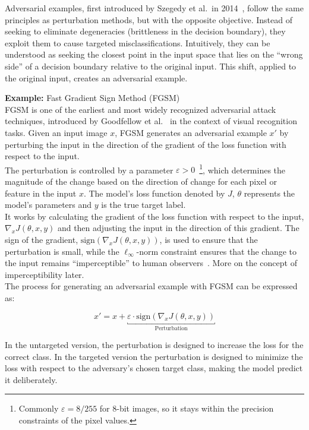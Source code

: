 \documentclass[a4paper, oneside]{discothesis}
\begin{document}
Adversarial examples, first introduced by Szegedy et al.\ in 2014~\cite{szegedy2013intriguing}, follow the same principles as perturbation methods, but with the opposite objective. Instead of seeking to eliminate degeneracies (brittleness in the decision boundary), they exploit them to cause targeted misclassifications. Intuitively, they can be understood as seeking the closest point in the input space that lies on the ``wrong side'' of a decision boundary relative to the original input. This shift, applied to the original input, creates an adversarial example.

\begin{highlightbox}
	\textbf{Example:} Fast Gradient Sign Method (FGSM) \\

	FGSM is one of the earliest and most widely recognized adversarial attack techniques, introduced by Goodfellow et al.~\cite{goodfellow2014explaining} in the context of visual recognition tasks. Given an input image $x$, FGSM generates an adversarial example $x'$ by perturbing the input in the direction of the gradient of the loss function with respect to the input.\\

	The perturbation is controlled by a parameter $\varepsilon > 0$~\footnote{Commonly $\varepsilon = 8/255$ for 8-bit images, so it stays within the precision constraints of the pixel values.}, which determines the magnitude of the change based on the direction of change for each pixel or feature in the input $x$. The model's loss function denoted by $J$, $\theta$ represents the model's parameters and $y$ is the true target label. \\
	
	It works by calculating the gradient of the loss function with respect to the input, $\nabla_x J(\theta, x, y)$ and then adjusting the input in the direction of this gradient. The sign of the gradient, $\text{sign}(\nabla_x J(\theta, x, y))$, is used to ensure that the perturbation is small, while the $\ell_\infty$-norm constraint ensures that the change to the input remains ``imperceptible'' to human observers~\cite{goodfellow2014explaining, zhang2019adversarial}. More on the concept of imperceptibility later.\\
	
	The process for generating an adversarial example with FGSM can be expressed as:
	
	$$x' = x + \underbracket{\varepsilon \cdot \text{sign}(\nabla_x J(\theta, x, y))}_{\text{Perturbation}}$$
	
	In the untargeted version, the perturbation is designed to increase the loss for the correct class. In the targeted version the perturbation is designed to minimize the loss with respect to the adversary's chosen target class, making the model predict it deliberately.
\end{highlightbox}
\end{document}
